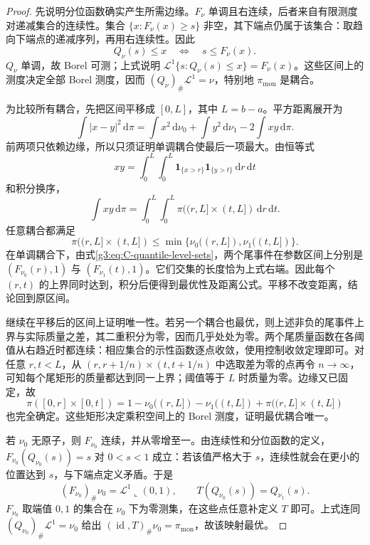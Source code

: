 \begin{proof}
	先说明分位函数确实产生所需边缘。\(F_\nu\) 单调且右连续，后者来自有限测度对递减集合的连续性。集合
	\(\{x:F_\nu(x)\ge s\}\) 非空，其下端点仍属于该集合：取趋向下端点的递减序列，再用右连续性。因此
	\begin{equation}\label{g3:eq:C-quantile-level-sets}
		Q_\nu(s)\le x\quad\Longleftrightarrow\quad s\le F_\nu(x).
	\end{equation}
	\(Q_\nu\) 单调，故 Borel 可测；上式说明
	\(\mathcal L^1\{s:Q_\nu(s)\le x\}=F_\nu(x)\)。这些区间上的测度决定全部 Borel 测度，因而
	\((Q_\nu)_\#\mathcal L^1=\nu\)，特别地 \(\pi_{\mathrm{mon}}\) 是耦合。

	为比较所有耦合，先把区间平移成 \([0,L]\)，其中 \(L=b-a\)。平方距离展开为
	\[
		\int|x-y|^2\,\mathrm d\pi
		=\int x^2\,\mathrm d\nu_0+\int y^2\,\mathrm d\nu_1
		 -2\int xy\,\mathrm d\pi.
	\]
	前两项只依赖边缘，所以只须证明单调耦合使最后一项最大。由恒等式
	\[
		x y=\int_0^L\int_0^L\mathbf1_{\{x>r\}}\mathbf1_{\{y>t\}}
		\,\mathrm dr\,\mathrm dt
	\]
	和积分换序，
	\[
		\int xy\,\mathrm d\pi
		=\int_0^L\int_0^L
		     \pi((r,L]\times(t,L])\,\mathrm dr\,\mathrm dt.
	\]
	任意耦合都满足
	\[
		\pi((r,L]\times(t,L])
		\le\min\{\nu_0((r,L]),\nu_1((t,L])\}.
	\]
	在单调耦合下，由式\eqref{g3:eq:C-quantile-level-sets}，两个尾事件在参数区间上分别是
	\((F_{\nu_0}(r),1)\) 与 \((F_{\nu_1}(t),1)\)。它们交集的长度恰为上式右端。因此每个 \((r,t)\) 的上界同时达到，积分后便得到最优性及距离公式。平移不改变距离，结论回到原区间。

	继续在平移后的区间上证明唯一性。若另一个耦合也最优，则上述非负的尾事件上界与实际质量之差，其二重积分为零，因而几乎处处为零。两个尾质量函数在各阈值从右趋近时都连续：相应集合的示性函数逐点收敛，使用控制收敛定理即可。对任意 \(r,t<L\)，从 \((r,r+1/n)\times(t,t+1/n)\) 中选取差为零的点再令 \(n\to\infty\)，可知每个尾矩形的质量都达到同一上界；阈值等于 \(L\) 时质量为零。边缘又已固定，故
	\[
		\pi([0,r]\times[0,t])
		=1-\nu_0((r,L])-\nu_1((t,L])
		 +\pi((r,L]\times(t,L])
	\]
	也完全确定。这些矩形决定乘积空间上的 Borel 测度，证明最优耦合唯一。

	若 \(\nu_0\) 无原子，则 \(F_{\nu_0}\) 连续，并从零增至一。由连续性和分位函数的定义，
	\(F_{\nu_0}(Q_{\nu_0}(s))=s\) 对 \(0<s<1\) 成立：若该值严格大于 \(s\)，连续性就会在更小的位置达到 \(s\)，与下端点定义矛盾。于是
	\[
		(F_{\nu_0})_\#\nu_0=\mathcal L^1\llcorner(0,1),\qquad
		T(Q_{\nu_0}(s))=Q_{\nu_1}(s).
	\]
	\(F_{\nu_0}\) 取端值 \(0,1\) 的集合在 \(\nu_0\) 下为零测集，在这些点任意补定义 \(T\) 即可。上式连同
	\((Q_{\nu_0})_\#\mathcal L^1=\nu_0\) 给出
	\((\operatorname{id},T)_\#\nu_0=\pi_{\mathrm{mon}}\)，故该映射最优。
\end{proof}

